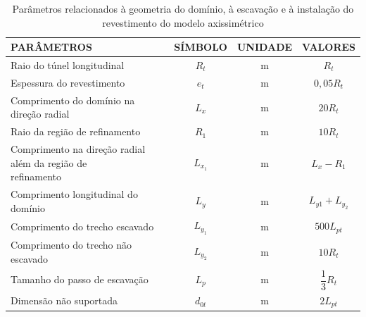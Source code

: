 \begin{table}[H]
	\caption{Parâmetros relacionados à geometria do domínio, à escavação e à instalação do revestimento do modelo axissimétrico}
	\label{tabelaaxi}
	\centering
	\small
	\renewcommand{\arraystretch}{1.5}
	\begin{tabular}{l c c c}
		\hline
		\multicolumn{1}{l}{\textbf{PARÂMETROS}} &
		\multicolumn{1}{c}{\textbf{SÍMBOLO}} &
		\multicolumn{1}{c}{\textbf{UNIDADE}} &
		\multicolumn{1}{c}{\textbf{VALORES}} \\
		\hline
		Raio do túnel longitudinal & $R_t$ & m & $R_t$ \\		
		Espessura do revestimento & $e_t$ & m & $0,05 R_t$ \\
		Comprimento do domínio na direção radial & $L_{x}$ & m & $20 R_t$ \\
		Raio da região de refinamento & $R_1$ & m & $10 R_t$ \\				
		\makecell[l]{Comprimento na direção radial além da região de \\  refinamento} & $L_{x_1}$ & m & $L_x - R_1$ \\	
		Comprimento longitudinal do domínio & $L_y$ & m & $L_{y1} + L_{y_2}$ \\
		Comprimento do trecho escavado & $L_{y_1}$ & m & $500 L_{pt}$ \\
		Comprimento do trecho não escavado & $L_{y_2}$ & m & $10 R_t$ \\				
		Tamanho do passo de escavação & $L_p$ & m & $\dfrac{1}{3} R_t$ \\
		Dimensão não suportada & $d_{0t}$ & m & $2L_{pt}$ \\
		\hline
	\end{tabular}
	\normalsize
\end{table}

